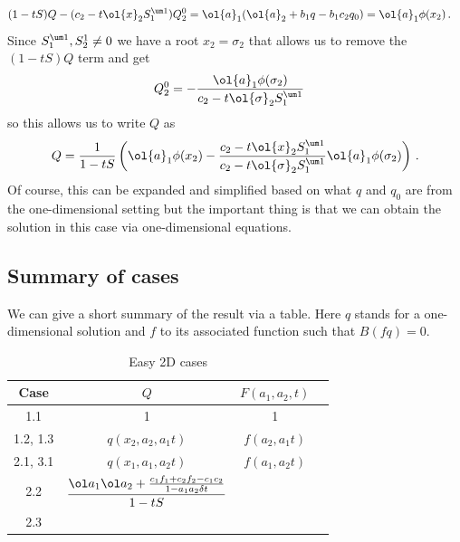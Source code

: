 \begin{align}
	(1-tS)Q - (c_2 -t\ol{x}_2 S_1^{\um 1})Q_2^0  &= \ol{a}_1(\ol{a}_2 + b_1 q  -b_1c_2q_0)  =\ol{a}_1\phi(x_2)\,.
\end{align}
Since $S_1^{\um 1},S_2^1 \neq 0$ we have a root $x_2 = \sigma_2$ that allows us to remove the $(1-tS)Q$ term and get
\begin{align}
	Q_2^0  &=-\frac{\ol{a}_1\phi(\sigma_2)}{ c_2 -t\ol{\sigma}_2 S_1^{\um 1}}
\end{align}
so this allows us to write $Q$ as
\begin{align}
	Q = \frac{1}{1-tS}\left(\ol{a}_1\phi(x_2) - \frac{c_2 -t\ol{x}_2 S_1^{\um 1}}{c_2 -t\ol{\sigma}_2 S_1^{\um 1}}\ol{a}_1\phi(\sigma_2)\right)\,.
\end{align}
Of course, this can be expanded and simplified based on what $q$ and $q_0$ are from the one-dimensional setting but the important thing is that we can obtain the solution in this case via one-dimensional equations.

\subsection{Summary of cases}
We can give a short summary of the result via a table. Here $q$ stands for a one-dimensional solution and $f$ to its associated function such that $B(fq) = 0$.
 \begin{table}[H]
    \caption{Easy 2D cases}
    \label{tbl:table2d}
    \centering
    \begin{tabular}{cccc}
    \toprule
    Case  & $Q$ & $F(a_1,a_2,t)$\\
    \midrule
    1.1  & 1 & 1 \\
    1.2, 1.3  & $q(x_2,a_2,a_1t)$ & $f(a_2,a_1t)$ \\
    2.1, 3.1 &  $q(x_1,a_1,a_2t)$ & $f(a_1,a_2t)$\\
    2.2  & $\dfrac{\ol a_1 \ol a_2+ \tfrac{c_1 f_1 + c_2 f_2- c_1 c_2}{1-a_1a_2 \delta t}}{1-tS}$ & \\
    2.3  & &\\
    \bottomrule
    \end{tabular}
\end{table}

\endinput
